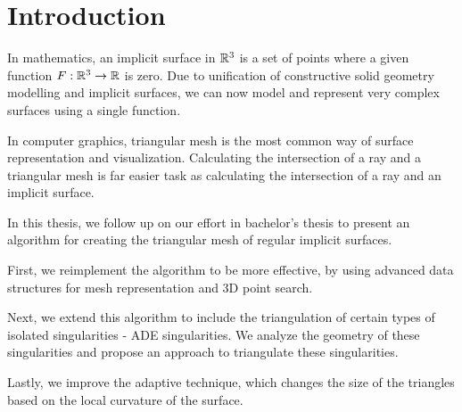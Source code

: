 \chapter*{Introduction} %

In mathematics, an implicit surface in $\mathbb{R}^3$ is a set of points where
a given function $F:\mathbb{R}^3 \to \mathbb{R}$ is zero. Due to
unification of constructive solid geometry modelling and 
implicit surfaces, we can now model and represent very 
complex surfaces using a single function.

In computer graphics, triangular mesh is the most common
way of surface representation and visualization. Calculating
the intersection of a ray and a triangular mesh is far 
easier task as calculating the intersection of a ray and
an implicit surface.

In this thesis, we follow up on our effort in bachelor's thesis
\cite{korecova2021triangulation} to present an algorithm for
creating the triangular mesh of regular implicit surfaces.

First, we reimplement the algorithm to be more effective,
by using advanced data structures for mesh representation 
and 3D point search.

Next, we extend this algorithm to include the triangulation
of certain types of isolated singularities - ADE singularities.
We analyze the geometry of these singularities and propose 
an approach to triangulate these singularities.

Lastly, we improve the adaptive technique, which changes the
size of the triangles based on the local curvature of the surface.